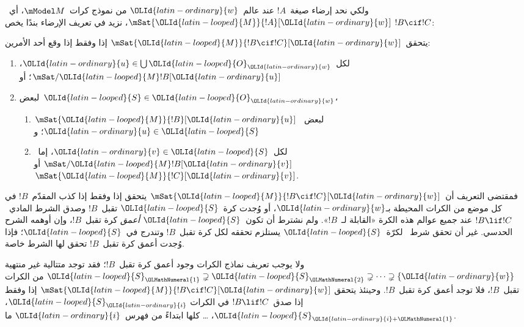 \documentclass[../../../include/open-logic-section]{subfiles}
\begin{document}
ولكي نحد إرضاء صيغة~$!A$ عند عالم~$\OLId{latin-ordinary}{w}$ من نموذج كرات~$\mModel M$،
أي~$\mSat{\OLId{latin-looped}{M}}{!A}[\OLId{latin-ordinary}{w}]$، نزيد في تعريف الإرضاء بندًا يخص
$!B \cif !C$:

\begin{defn}
  يتحقق~$\mSat{\OLId{latin-looped}{M}}{!B \cif !C}[\OLId{latin-ordinary}{w}]$ إذا وفقط إذا وقع أحد الأمرين:
  \begin{enumerate}
  \item{} لكل~$\OLId{latin-ordinary}{u} \in \bigcup \OLId{latin-looped}{O}_\OLId{latin-ordinary}{w}$،
    $\mSat/{\OLId{latin-looped}{M}}{!B}[\OLId{latin-ordinary}{u}]$؛ أو
  \item{} لبعض~$\OLId{latin-looped}{S} \in \OLId{latin-looped}{O}_\OLId{latin-ordinary}{w}$،
    \begin{enumerate}
      \item $\mSat{\OLId{latin-looped}{M}}{!B}[\OLId{latin-ordinary}{u}]$ لبعض~$\OLId{latin-ordinary}{u} \in \OLId{latin-looped}{S}$؛ و
      \item لكل~$\OLId{latin-ordinary}{v} \in \OLId{latin-looped}{S}$، إما~$\mSat/{\OLId{latin-looped}{M}}{!B}[\OLId{latin-ordinary}{v}]$ أو
        $\mSat{\OLId{latin-looped}{M}}{!C}[\OLId{latin-ordinary}{v}]$.
    \end{enumerate}
  \end{enumerate}
\end{defn}

فمقتضى التعريف أن~$\mSat{\OLId{latin-looped}{M}}{!B \cif !C}[\OLId{latin-ordinary}{w}]$ يتحقق إذا وفقط إذا كذب
المقدّم~$!B$ في كل موضع من الكرات المحيطة بـ$\OLId{latin-ordinary}{w}$، أو وُجدت كرة~$\OLId{latin-looped}{S}$
تقبل~$!B$ وصدق الشرط المادي~$!B \lif !C$ عند جميع عوالم هذه الكرة
«القابلة لـ~$!B$». ولم نشترط أن تكون~$\OLId{latin-looped}{S}$ \emph{أعمق} كرة تقبل~$!B$،
وإن أوهمه الشرح الحدسي. غير أن تحقق شرط~ لكرّة~$\OLId{latin-looped}{S}$
يستلزم تحققه لكل كرة تقبل~$!B$ وتندرج في~$\OLId{latin-looped}{S}$؛ فإذا وُجدت أعمق كرة
تقبل~$!B$ تحقق لها الشرط خاصة.

ولا يوجب تعريف نماذج الكرات وجود أعمق كرة تقبل~$!B$؛ فقد توجد متتالية
غير منتهية
$\OLId{latin-looped}{S}_\OLMathNumeral{1} \supsetneq \OLId{latin-looped}{S}_\OLMathNumeral{2} \supsetneq \dots \supsetneq \{\OLId{latin-ordinary}{w}\}$ من الكرات
تقبل~$!B$، فلا توجد أعمق كرة تقبل~$!B$. وحينئذ يتحقق
$\mSat{\OLId{latin-looped}{M}}{!B \cif !C}[\OLId{latin-ordinary}{w}]$ إذا وفقط إذا صدق~$!B \lif !C$ في الكرات
$\OLId{latin-looped}{S}_\OLId{latin-ordinary}{i}$، $\OLId{latin-looped}{S}_{\OLId{latin-ordinary}{i}+\OLMathNumeral{1}}$، \dots{} كلها ابتداءً من فهرس~$\OLId{latin-ordinary}{i}$ ما.
\end{document}

